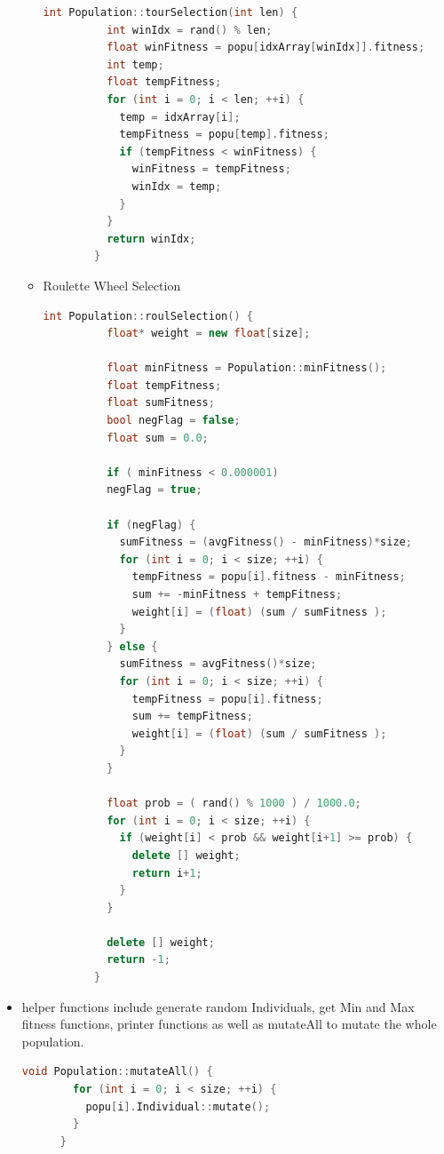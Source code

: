 \documentclass{article}
\begin{document}
\begin{CJK}{UTF8}{gbsn}
\begin{itemize}
\begin{itemize}
\begin{lstlisting}[language=c++]
        int Population::tourSelection(int len) {
          int winIdx = rand() % len;
          float winFitness = popu[idxArray[winIdx]].fitness;
          int temp;
          float tempFitness;
          for (int i = 0; i < len; ++i) {
            temp = idxArray[i];
            tempFitness = popu[temp].fitness;
            if (tempFitness < winFitness) {
              winFitness = tempFitness;
              winIdx = temp;
            }
          }
          return winIdx;
        }
      \end{lstlisting}

    \item Roulette Wheel Selection
      \begin{lstlisting}[language=c++]
        int Population::roulSelection() {
          float* weight = new float[size];

          float minFitness = Population::minFitness();
          float tempFitness;
          float sumFitness;
          bool negFlag = false;
          float sum = 0.0;

          if ( minFitness < 0.000001)
          negFlag = true;

          if (negFlag) {
            sumFitness = (avgFitness() - minFitness)*size;
            for (int i = 0; i < size; ++i) {
              tempFitness = popu[i].fitness - minFitness;
              sum += -minFitness + tempFitness;
              weight[i] = (float) (sum / sumFitness );
            }
          } else {
            sumFitness = avgFitness()*size;
            for (int i = 0; i < size; ++i) {
              tempFitness = popu[i].fitness;
              sum += tempFitness;
              weight[i] = (float) (sum / sumFitness );
            }
          }

          float prob = ( rand() % 1000 ) / 1000.0;
          for (int i = 0; i < size; ++i) {
            if (weight[i] < prob && weight[i+1] >= prob) {
              delete [] weight;
              return i+1;
            }
          }

          delete [] weight;
          return -1;
        }
      \end{lstlisting}
    \end{itemize}

  \item helper functions include generate random Individuals, get Min and Max fitness functions, printer functions as well as mutateAll to mutate the whole population.
    \begin{lstlisting}[language=c++]
      void Population::mutateAll() { 
        for (int i = 0; i < size; ++i) {
          popu[i].Individual::mutate();
        }
      }


\end{lstlisting}
\end{itemize}
\end{CJK}
\end{document}
